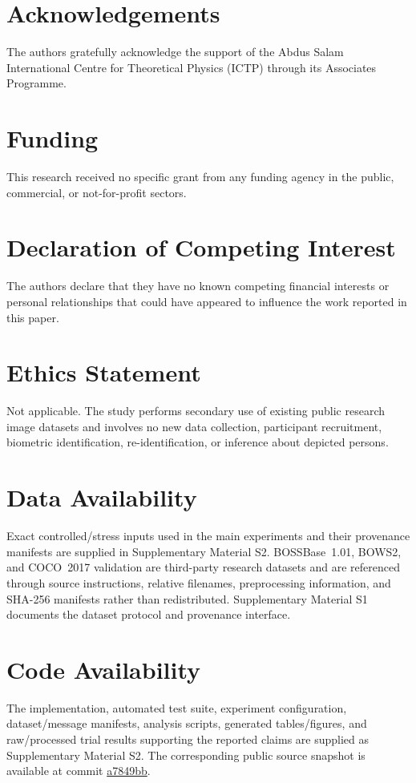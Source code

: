 \documentclass[preprint,12pt]{elsarticle}
\theoremstyle{plain}
\begin{document}
\section*{Acknowledgements}
The authors gratefully acknowledge the support of the Abdus Salam International Centre for Theoretical Physics (ICTP) through its Associates Programme.

\section*{Funding}
This research received no specific grant from any funding agency in the public, commercial, or not-for-profit sectors.
\section*{Declaration of Competing Interest}
The authors declare that they have no known competing financial interests or personal relationships that could have appeared to influence the work reported in this paper.
\section*{Ethics Statement}
Not applicable. The study performs secondary use of existing public research image datasets and involves no new data collection, participant recruitment, biometric identification, re-identification, or inference about depicted persons.
\section*{Data Availability}
Exact controlled/stress inputs used in the main experiments and their provenance manifests are supplied in Supplementary Material S2. BOSSBase~1.01, BOWS2, and COCO~2017 validation are third-party research datasets and are referenced through source instructions, relative filenames, preprocessing information, and SHA-256 manifests rather than redistributed. Supplementary Material S1 documents the dataset protocol and provenance interface.

\section*{Code Availability}
The implementation, automated test suite, experiment configuration, dataset/message manifests, analysis scripts, generated tables/figures, and raw/processed trial results supporting the reported claims are supplied as Supplementary Material S2. The corresponding public source snapshot is available at commit \href{https://github.com/EkodeckStephane/FHAM/tree/a7849bb}{a7849bb}.
\end{document}

